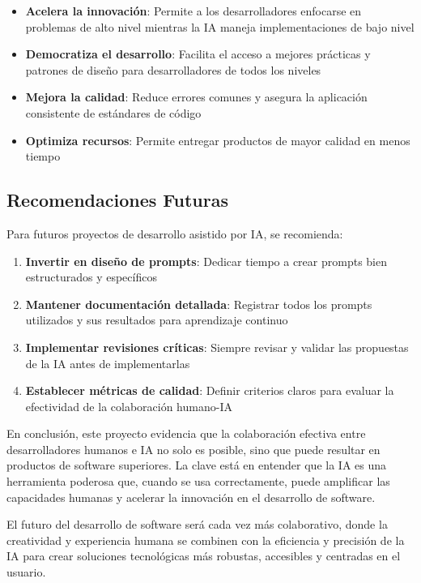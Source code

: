 \documentclass[12pt,a4paper]{article}
\begin{document}
\begin{itemize}
    \item \textbf{Acelera la innovación}: Permite a los desarrolladores enfocarse en problemas de alto nivel mientras la IA maneja implementaciones de bajo nivel
    \item \textbf{Democratiza el desarrollo}: Facilita el acceso a mejores prácticas y patrones de diseño para desarrolladores de todos los niveles
    \item \textbf{Mejora la calidad}: Reduce errores comunes y asegura la aplicación consistente de estándares de código
    \item \textbf{Optimiza recursos}: Permite entregar productos de mayor calidad en menos tiempo
\end{itemize}

\subsection{Recomendaciones Futuras}

Para futuros proyectos de desarrollo asistido por IA, se recomienda:

\begin{enumerate}
    \item \textbf{Invertir en diseño de prompts}: Dedicar tiempo a crear prompts bien estructurados y específicos
    \item \textbf{Mantener documentación detallada}: Registrar todos los prompts utilizados y sus resultados para aprendizaje continuo
    \item \textbf{Implementar revisiones críticas}: Siempre revisar y validar las propuestas de la IA antes de implementarlas
    \item \textbf{Establecer métricas de calidad}: Definir criterios claros para evaluar la efectividad de la colaboración humano-IA
\end{enumerate}

En conclusión, este proyecto evidencia que la colaboración efectiva entre desarrolladores humanos e IA no solo es posible, sino que puede resultar en productos de software superiores. La clave está en entender que la IA es una herramienta poderosa que, cuando se usa correctamente, puede amplificar las capacidades humanas y acelerar la innovación en el desarrollo de software.

El futuro del desarrollo de software será cada vez más colaborativo, donde la creatividad y experiencia humana se combinen con la eficiencia y precisión de la IA para crear soluciones tecnológicas más robustas, accesibles y centradas en el usuario.
\end{document}
